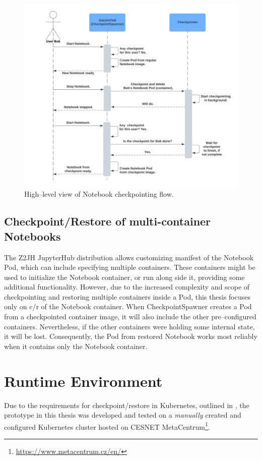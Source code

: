 \documentclass[
  digital,     %
  oneside,     %
  nosansbold,  %
  nocolorbold, %
  lof,         %
  lot,         %
]{fithesis4}
\begin{document}
\begin{figure}[H]
  \begin{center}
  \includegraphics[width=\textwidth]{figures/checkpoint-highlevel.png}
  \end{center}
  \caption{High--level view of Notebook checkpointing flow.}
  \label{fig:checkpoint-highlevel}
\end{figure}

\subsection{Checkpoint/Restore of multi-container Notebooks}
The Z2JH JupyterHub distribution allows customizing manifest of the Notebook Pod, which can include specifying multiple containers. These containers might be used to initialize the Notebook container, or run along side it, providing some additional functionality. However, due to the increased complexity and scope of checkpointing and restoring multiple containers inside a Pod, this thesis focuses only on c/r of the Notebook container. When CheckpointSpawner creates a Pod from a checkpointed container image, it will also include the other pre--configured containers. Nevertheless, if the other containers were holding some internal state, it will be lost. Consequently, the Pod from restored Notebook works most reliably when it contains only the Notebook container.


\section{Runtime Environment}
Due to the requirements for checkpoint/restore in Kubernetes, outlined in , the prototype in this thesis was developed and tested on a \emph{manually} created and configured Kubernetes cluster hosted on CESNET MetaCentrum\footnote{\url{https://www.metacentrum.cz/en/}}. 
\end{document}
